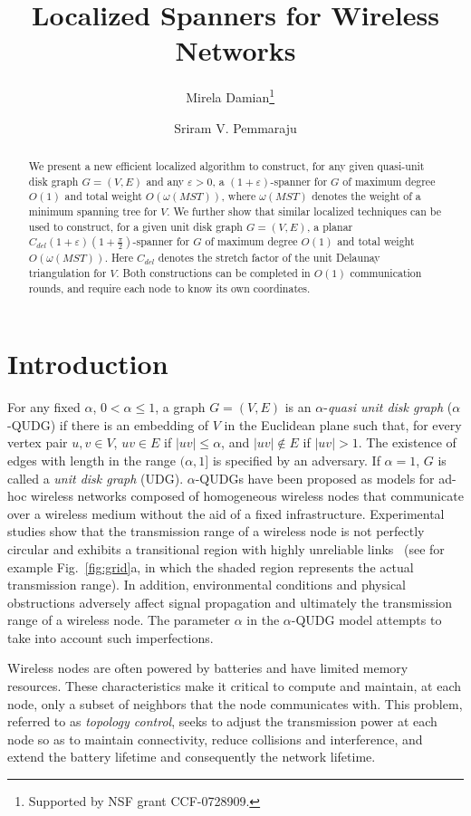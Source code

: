 \documentclass{llncs}
\title{\vspace{-2em}Localized Spanners for Wireless Networks}
\author{Mirela Damian\thanks{Supported by NSF grant CCF-0728909.}
\inst{1}\ \and Sriram V. Pemmaraju\inst{2}}
\institute{Dept. Comput. Sci., Villanova Univ., Villanova, PA
19085, USA. \email{mirela.damian@villanova.edu}.
\and
Dept. Comput. Sci., Univ. of Iowa, Iowa City, IA
52246, USA. \email{sriram@cs.uiowa.edu}.
}
\date{}
\newcommand{\e}{\varepsilon}
\newcommand{\w}{\omega}
\begin{document}
\maketitle

\begin{abstract}
We present a new efficient localized algorithm to construct, for any
given quasi-unit disk graph $G=(V,E)$ and any $\e > 0$,
a $(1+\e)$-spanner for $G$ of maximum
degree $O(1)$ and total weight $O(\w(MST))$, where $\w(MST)$
denotes the weight of a minimum spanning tree for $V$. We further
show that similar localized techniques can be used to construct, for a given unit disk
graph $G = (V, E)$, a planar $C_{del}(1+\e)(1+\frac{\pi}{2})$-spanner
for $G$ of maximum degree $O(1)$ and total weight $O(\w(MST))$. Here $C_{del}$
denotes the stretch factor of the unit Delaunay triangulation for $V$.
Both constructions can be completed in $O(1)$ communication rounds,
and require each node to know its own coordinates.
\end{abstract}

\section{Introduction}
For any fixed $\alpha$, $0 < \alpha \le 1$, a graph $G = (V,E)$ is an
$\alpha$-\emph{quasi unit disk graph} ($\alpha$-QUDG) if there is an
embedding of $V$ in the Euclidean plane such that, for every vertex
pair $u, v \in V$, $uv \in E$ if $|uv| \le \alpha$, and $|uv|
\not\in E$ if $|uv| > 1$. The existence of edges with length in the
range $(\alpha, 1]$ is specified by an adversary. If $\alpha=1$, $G$
is called a \emph{unit disk graph} (UDG). $\alpha$-QUDGs
have been proposed as models for ad-hoc wireless networks
composed of homogeneous wireless nodes that communicate over a wireless medium without the aid of a fixed
infrastructure. Experimental studies show that the transmission range of a wireless
node is not perfectly circular and exhibits a transitional region
with highly unreliable links~\cite{ZK-qudg-07} (see for example
Fig.~\ref{fig:grid}a, in which the shaded region represents the
actual transmission range). In addition,
environmental conditions and physical obstructions adversely affect
signal propagation and ultimately the transmission range of a
wireless node. The parameter $\alpha$ in the $\alpha$-QUDG model
attempts to take into account such imperfections.

Wireless nodes are often powered by batteries and have limited
memory resources. These characteristics make it critical to
compute and maintain, at each node, only a subset of neighbors
that the node communicates with. This problem, referred to as
\emph{topology control}, seeks to adjust the transmission power
at each node so as to maintain connectivity, reduce
collisions and interference, and extend the battery lifetime
and consequently the network lifetime.
\end{document}
